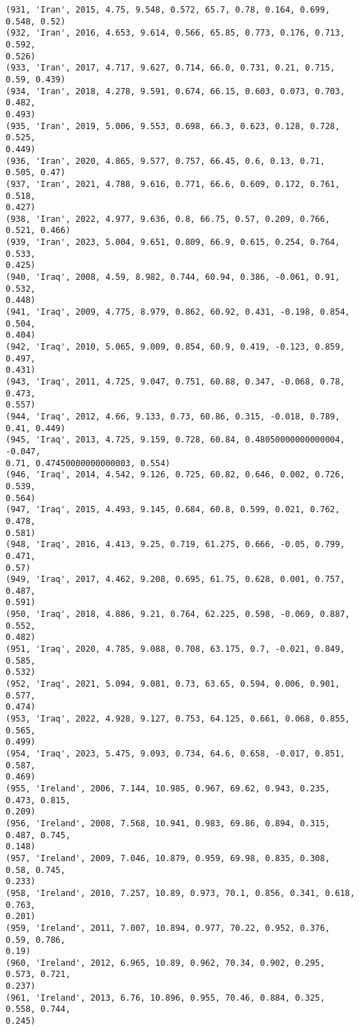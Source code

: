 \documentclass[11pt]{article}
\begin{document}
\begin{Verbatim}[commandchars=\\\{\}]
(931, 'Iran', 2015, 4.75, 9.548, 0.572, 65.7, 0.78, 0.164, 0.699, 0.548, 0.52)
(932, 'Iran', 2016, 4.653, 9.614, 0.566, 65.85, 0.773, 0.176, 0.713, 0.592,
0.526)
(933, 'Iran', 2017, 4.717, 9.627, 0.714, 66.0, 0.731, 0.21, 0.715, 0.59, 0.439)
(934, 'Iran', 2018, 4.278, 9.591, 0.674, 66.15, 0.603, 0.073, 0.703, 0.482,
0.493)
(935, 'Iran', 2019, 5.006, 9.553, 0.698, 66.3, 0.623, 0.128, 0.728, 0.525,
0.449)
(936, 'Iran', 2020, 4.865, 9.577, 0.757, 66.45, 0.6, 0.13, 0.71, 0.505, 0.47)
(937, 'Iran', 2021, 4.788, 9.616, 0.771, 66.6, 0.609, 0.172, 0.761, 0.518,
0.427)
(938, 'Iran', 2022, 4.977, 9.636, 0.8, 66.75, 0.57, 0.209, 0.766, 0.521, 0.466)
(939, 'Iran', 2023, 5.004, 9.651, 0.809, 66.9, 0.615, 0.254, 0.764, 0.533,
0.425)
(940, 'Iraq', 2008, 4.59, 8.982, 0.744, 60.94, 0.386, -0.061, 0.91, 0.532,
0.448)
(941, 'Iraq', 2009, 4.775, 8.979, 0.862, 60.92, 0.431, -0.198, 0.854, 0.504,
0.404)
(942, 'Iraq', 2010, 5.065, 9.009, 0.854, 60.9, 0.419, -0.123, 0.859, 0.497,
0.431)
(943, 'Iraq', 2011, 4.725, 9.047, 0.751, 60.88, 0.347, -0.068, 0.78, 0.473,
0.557)
(944, 'Iraq', 2012, 4.66, 9.133, 0.73, 60.86, 0.315, -0.018, 0.789, 0.41, 0.449)
(945, 'Iraq', 2013, 4.725, 9.159, 0.728, 60.84, 0.48050000000000004, -0.047,
0.71, 0.47450000000000003, 0.554)
(946, 'Iraq', 2014, 4.542, 9.126, 0.725, 60.82, 0.646, 0.002, 0.726, 0.539,
0.564)
(947, 'Iraq', 2015, 4.493, 9.145, 0.684, 60.8, 0.599, 0.021, 0.762, 0.478,
0.581)
(948, 'Iraq', 2016, 4.413, 9.25, 0.719, 61.275, 0.666, -0.05, 0.799, 0.471,
0.57)
(949, 'Iraq', 2017, 4.462, 9.208, 0.695, 61.75, 0.628, 0.001, 0.757, 0.487,
0.591)
(950, 'Iraq', 2018, 4.886, 9.21, 0.764, 62.225, 0.598, -0.069, 0.887, 0.552,
0.482)
(951, 'Iraq', 2020, 4.785, 9.088, 0.708, 63.175, 0.7, -0.021, 0.849, 0.585,
0.532)
(952, 'Iraq', 2021, 5.094, 9.081, 0.73, 63.65, 0.594, 0.006, 0.901, 0.577,
0.474)
(953, 'Iraq', 2022, 4.928, 9.127, 0.753, 64.125, 0.661, 0.068, 0.855, 0.565,
0.499)
(954, 'Iraq', 2023, 5.475, 9.093, 0.734, 64.6, 0.658, -0.017, 0.851, 0.587,
0.469)
(955, 'Ireland', 2006, 7.144, 10.985, 0.967, 69.62, 0.943, 0.235, 0.473, 0.815,
0.209)
(956, 'Ireland', 2008, 7.568, 10.941, 0.983, 69.86, 0.894, 0.315, 0.487, 0.745,
0.148)
(957, 'Ireland', 2009, 7.046, 10.879, 0.959, 69.98, 0.835, 0.308, 0.58, 0.745,
0.233)
(958, 'Ireland', 2010, 7.257, 10.89, 0.973, 70.1, 0.856, 0.341, 0.618, 0.763,
0.201)
(959, 'Ireland', 2011, 7.007, 10.894, 0.977, 70.22, 0.952, 0.376, 0.59, 0.786,
0.19)
(960, 'Ireland', 2012, 6.965, 10.89, 0.962, 70.34, 0.902, 0.295, 0.573, 0.721,
0.237)
(961, 'Ireland', 2013, 6.76, 10.896, 0.955, 70.46, 0.884, 0.325, 0.558, 0.744,
0.245)

\end{Verbatim}
\end{document}
